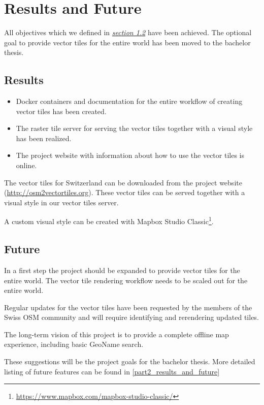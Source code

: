 \chapter{Results and Future}\label{part1_results_and_future}

All objectives which we defined in \hyperref[targets]{\emph{section 1.2}} have been achieved. The optional goal to provide vector tiles for the entire world has been moved to the bachelor thesis.

\section{Results}\label{part1_results}

\begin{itemize}
\item
  Docker containers and documentation for the entire workflow of creating vector tiles has been created.
\item
  The raster tile server for serving the vector tiles together with a visual style has been realized.
\item
  The project website with information about how to use the vector tiles is online.
\end{itemize}

The vector tiles for Switzerland can be downloaded from the project website (\url{http://osm2vectortiles.org}). These vector tiles can be served together with a visual style in our vector tiles server.

A custom visual style can be created with Mapbox Studio Classic\footnote{\url{https://www.mapbox.com/mapbox-studio-classic/}}.

\section{Future}\label{part1_future}
In a first step the project should be expanded to provide vector tiles for the entire world.
The vector tile rendering workflow needs to be scaled out for the entire world.

Regular updates for the vector tiles have been requested by the members of the Swiss OSM community
and will require identifying and rerendering updated tiles.

The long-term vision of this project is to provide a complete offline map experience, including basic GeoName search.

These suggestions will be the project goals for the bachelor thesis. More detailed listing of
future features can be found in \autoref{part2_results_and_future}

\newpage